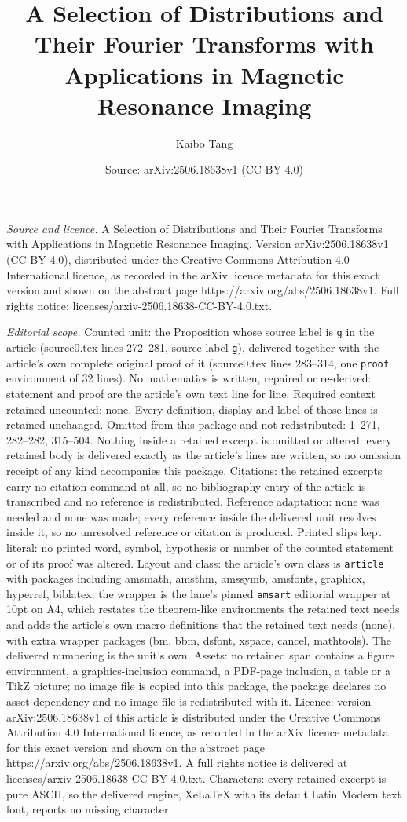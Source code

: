 \documentclass[10pt,a4paper]{amsart}
\title[A Selection of Distributions and Their Fourier Transforms wi]{A Selection of Distributions and Their Fourier Transforms with Applications in Magnetic Resonance Imaging}
\author{Kaibo Tang}
\date{Source: arXiv:2506.18638v1 (CC BY 4.0)}
\begin{document}
\maketitle

\noindent\emph{Source and licence.} A Selection of Distributions and Their Fourier Transforms with Applications in Magnetic Resonance Imaging. Version arXiv:2506.18638v1 (CC BY 4.0), distributed under the Creative Commons Attribution 4.0 International licence, as recorded in the arXiv licence metadata for this exact version and shown on the abstract page https://arxiv.org/abs/2506.18638v1. Full rights notice: licenses/arxiv-2506.18638-CC-BY-4.0.txt.\par\smallskip

\noindent\textit{Editorial scope.} Counted unit: the Proposition whose source label is \texttt{g} in the article (source0.tex lines 272--281, source label \texttt{g}), delivered together with the article's own complete original proof of it (source0.tex lines 283--314, one \texttt{proof} environment of 32 lines). No mathematics is written, repaired or re-derived: statement and proof are the article's own text line for line. Required context retained uncounted: none. Every definition, display and label of those lines is retained unchanged. Omitted from this package and not redistributed: 1--271, 282--282, 315--504. Nothing inside a retained excerpt is omitted or altered: every retained body is delivered exactly as the article's lines are written, so no omission receipt of any kind accompanies this package. Citations: the retained excerpts carry no citation command at all, so no bibliography entry of the article is transcribed and no reference is redistributed. Reference adaptation: none was needed and none was made; every reference inside the delivered unit resolves inside it, so no unresolved reference or citation is produced. Printed slips kept literal: no printed word, symbol, hypothesis or number of the counted statement or of its proof was altered. Layout and class: the article's own class is \texttt{article} with packages including amsmath, amsthm, amssymb, amsfonts, graphicx, hyperref, biblatex; the wrapper is the lane's pinned \texttt{amsart} editorial wrapper at 10pt on A4, which restates the theorem-like environments the retained text needs and adds the article's own macro definitions that the retained text needs (none), with extra wrapper packages (bm, bbm, dsfont, xspace, cancel, mathtools). The delivered numbering is the unit's own. Assets: no retained span contains a figure environment, a graphics-inclusion command, a PDF-page inclusion, a table or a TikZ picture; no image file is copied into this package, the package declares no asset dependency and no image file is redistributed with it. Licence: version arXiv:2506.18638v1 of this article is distributed under the Creative Commons Attribution 4.0 International licence, as recorded in the arXiv licence metadata for this exact version and shown on the abstract page https://arxiv.org/abs/2506.18638v1. A full rights notice is delivered at licenses/arxiv-2506.18638-CC-BY-4.0.txt. Characters: every retained excerpt is pure ASCII, so the delivered engine, XeLaTeX with its default Latin Modern text font, reports no missing character.
\end{document}
